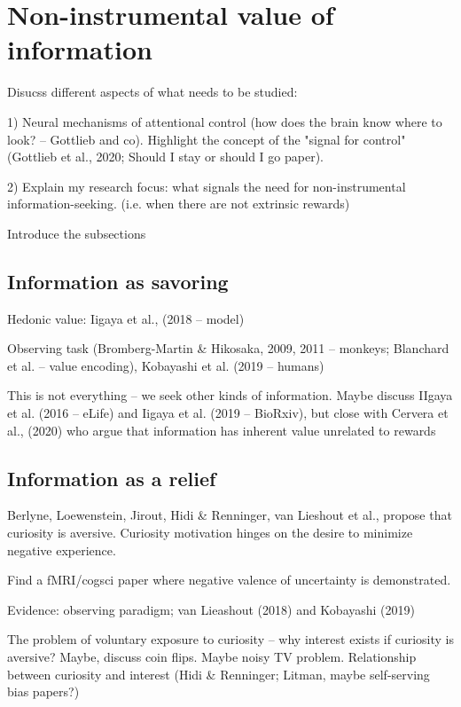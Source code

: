 
\section{Non-instrumental value of information}

    Disucss different aspects of what needs to be studied: 
    
    1) Neural mechanisms of attentional control (how does the brain know where to look? -- Gottlieb and co). Highlight the concept of the "signal for control" (Gottlieb et al., 2020; Should I stay or should I go paper).

    2) Explain my research focus: what signals the need for non-instrumental information-seeking. (i.e. when there are not extrinsic rewards)\

    Introduce the subsections

    \subsection{Information as savoring}

        Hedonic value: Iigaya et al., (2018 -- model) 
            
        Observing task (Bromberg-Martin & Hikosaka, 2009, 2011 -- monkeys; Blanchard et al. -- value encoding), Kobayashi et al. (2019 -- humans)

        This is not everything -- we seek other kinds of information. Maybe discuss IIgaya et al. (2016 -- eLife) and Iigaya et al. (2019 -- BioRxiv), but close with Cervera et al., (2020) who argue that information has inherent value unrelated to rewards

    \subsection{Information as a relief}

        Berlyne, Loewenstein, Jirout, Hidi & Renninger, van Lieshout et al., propose that curiosity is aversive. Curiosity motivation hinges on the desire to minimize negative experience.

        Find a fMRI/cogsci paper where negative valence of uncertainty is demonstrated.

        Evidence: observing paradigm; van Lieashout (2018) and Kobayashi (2019)

        The problem of voluntary exposure to curiosity -- why interest exists if curiosity is aversive? Maybe, discuss coin flips. Maybe noisy TV problem. Relationship between curiosity and interest (Hidi & Renninger; Litman, maybe self-serving bias papers?)

